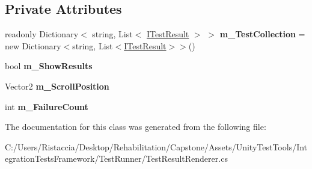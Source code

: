 \subsection*{Private Attributes}
\begin{DoxyCompactItemize}
\item 
\mbox{\label{class_test_result_renderer_ab16996c618171b3253c2c2dd481877c4}} 
readonly Dictionary$<$ string, List$<$ \hyperlink{interface_i_test_result}{I\+Test\+Result} $>$ $>$ {\bfseries m\+\_\+\+Test\+Collection} = new Dictionary$<$string, List$<$\hyperlink{interface_i_test_result}{I\+Test\+Result}$>$$>$()
\item 
\mbox{\label{class_test_result_renderer_a7189564ac1cc7259f333cdc314b819ef}} 
bool {\bfseries m\+\_\+\+Show\+Results}
\item 
\mbox{\label{class_test_result_renderer_aa70ffefa4eefa34272a59c23a50fcb1b}} 
Vector2 {\bfseries m\+\_\+\+Scroll\+Position}
\item 
\mbox{\label{class_test_result_renderer_a0ca8772d3e0caf2f382a505bbeb663d9}} 
int {\bfseries m\+\_\+\+Failure\+Count}
\end{DoxyCompactItemize}


The documentation for this class was generated from the following file\+:\begin{DoxyCompactItemize}
\item 
C\+:/\+Users/\+Ristaccia/\+Desktop/\+Rehabilitation/\+Capstone/\+Assets/\+Unity\+Test\+Tools/\+Integration\+Tests\+Framework/\+Test\+Runner/Test\+Result\+Renderer.\+cs\end{DoxyCompactItemize}
